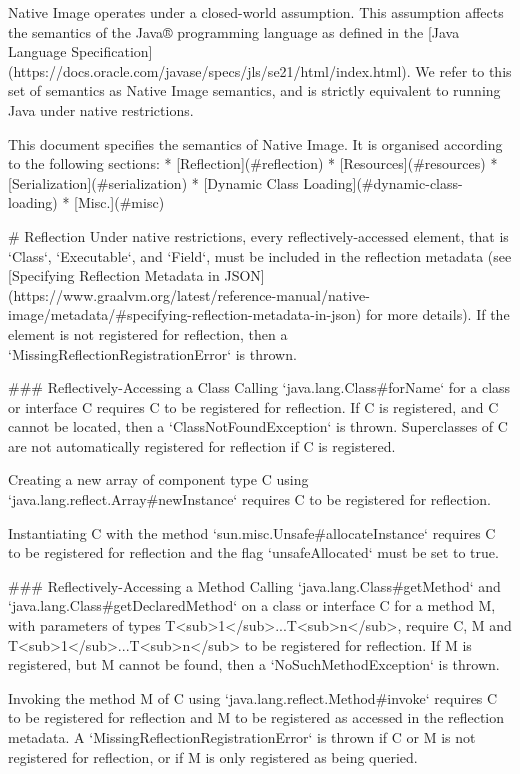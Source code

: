 Native Image operates under a closed-world assumption. This assumption affects the semantics of the 
Java® programming language as defined in the 
[Java Language Specification](https://docs.oracle.com/javase/specs/jls/se21/html/index.html).
We refer to this set of semantics as Native Image semantics, and is strictly equivalent to running
Java under native restrictions.

This document specifies the semantics of Native Image.
It is organised according to the following sections:
* [Reflection](#reflection)
* [Resources](#resources)
* [Serialization](#serialization)
* [Dynamic Class Loading](#dynamic-class-loading)
* [Misc.](#misc)

# Reflection
Under native restrictions, every reflectively-accessed element, that is `Class`, `Executable`, and `Field`, must 
be included in the reflection metadata (see [Specifying Reflection Metadata in JSON](https://www.graalvm.org/latest/reference-manual/native-image/metadata/#specifying-reflection-metadata-in-json)
for more details). If the element is not registered for reflection, then a `MissingReflectionRegistrationError` is thrown.

### Reflectively-Accessing a Class
Calling `java.lang.Class#forName` for a class or interface C requires C to be registered for reflection.
If C is registered, and C cannot be located, then a `ClassNotFoundException` is thrown. 
Superclasses of C are not automatically registered for reflection if C is registered.

Creating a new array of component type C using `java.lang.reflect.Array#newInstance` requires C to be 
registered for reflection.

Instantiating C with the method `sun.misc.Unsafe#allocateInstance` requires C to be 
registered for reflection and the flag `unsafeAllocated` must be set to true.

### Reflectively-Accessing a Method
Calling `java.lang.Class#getMethod` and `java.lang.Class#getDeclaredMethod` on a class or interface C for a method M, 
with parameters of types T<sub>1</sub>...T<sub>n</sub>, require C, M and T<sub>1</sub>...T<sub>n</sub> to be registered 
for reflection.
If M is registered, but M cannot be found, then a `NoSuchMethodException` is thrown.

Invoking the method M of C using `java.lang.reflect.Method#invoke` requires C to be registered for reflection
and M to be registered as accessed in the reflection metadata.
A `MissingReflectionRegistrationError` is thrown if C or M is not registered for reflection, or 
if M is only registered as being queried.

